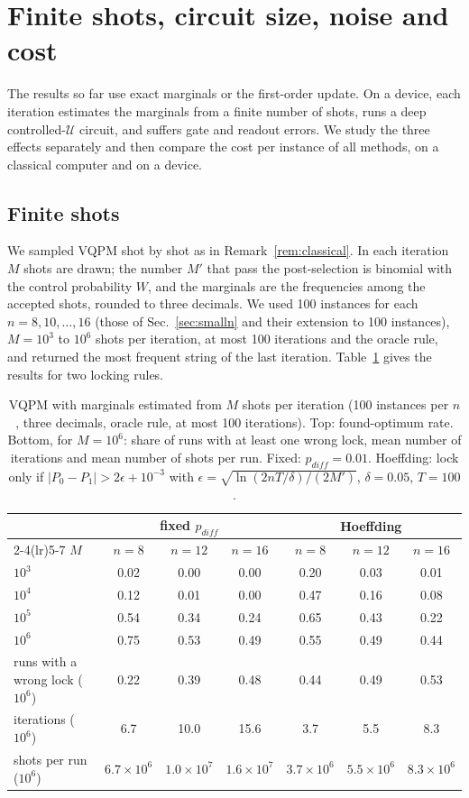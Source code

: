 \documentclass[onecolumn,10pt]{article}
\theoremstyle{remark}
\theoremstyle{plain}
\begin{document}
\section{Finite shots, circuit size, noise and cost}
\label{sec:noise}
The results so far use exact marginals or the first-order update. On a device, each iteration estimates the marginals from a finite number of shots, runs a deep controlled-$\mathcal U$ circuit, and suffers gate and readout errors. We study the three effects separately and then compare the cost per instance of all methods, on a classical computer and on a device.

\subsection{Finite shots}
\label{sec:shots}
We sampled VQPM shot by shot as in Remark~\ref{rem:classical}. In each iteration $M$ shots are drawn; the number $M'$ that pass the post-selection is binomial with the control probability $W$, and the marginals are the frequencies among the accepted shots, rounded to three decimals. We used 100 instances for each $n=8,10,\dots,16$ (those of Sec.~\ref{sec:smalln} and their extension to 100 instances), $M=10^3$ to $10^6$ shots per iteration, at most 100 iterations and the oracle rule, and returned the most frequent string of the last iteration. Table~\ref{tab:shots} gives the results for two locking rules.

\begin{table}[ht]
\centering
\small
\setlength{\tabcolsep}{5pt}
\caption{VQPM with marginals estimated from $M$ shots per iteration (100 instances per $n$, three decimals, oracle rule, at most 100 iterations). Top: found-optimum rate. Bottom, for $M=10^6$: share of runs with at least one wrong lock, mean number of iterations and mean number of shots per run. Fixed: $p_{diff}=0.01$. Hoeffding: lock only if $|P_0-P_1|>2\epsilon+10^{-3}$ with $\epsilon=\sqrt{\ln(2nT/\delta)/(2M')}$, $\delta=0.05$, $T=100$.}
\label{tab:shots}
\begin{tabular}{l ccc ccc}
\toprule
 & \multicolumn{3}{c}{fixed $p_{diff}$} & \multicolumn{3}{c}{Hoeffding} \\
 \cmidrule(lr){2-4}\cmidrule(lr){5-7}
$M$ & $n=8$ & $n=12$ & $n=16$ & $n=8$ & $n=12$ & $n=16$ \\
\midrule
$10^3$ & 0.02 & 0.00 & 0.00 & 0.20 & 0.03 & 0.01 \\
$10^4$ & 0.12 & 0.01 & 0.00 & 0.47 & 0.16 & 0.08 \\
$10^5$ & 0.54 & 0.34 & 0.24 & 0.65 & 0.43 & 0.22 \\
$10^6$ & 0.75 & 0.53 & 0.49 & 0.55 & 0.49 & 0.44 \\
\midrule
runs with a wrong lock ($10^6$) & 0.22 & 0.39 & 0.48 & 0.44 & 0.49 & 0.53 \\
iterations ($10^6$) & 6.7 & 10.0 & 15.6 & 3.7 & 5.5 & 8.3 \\
shots per run ($10^6$) & $6.7\times10^6$ & $1.0\times10^7$ & $1.6\times10^7$ & $3.7\times10^6$ & $5.5\times10^6$ & $8.3\times10^6$ \\
\bottomrule
\end{tabular}
\end{table}
\end{document}
